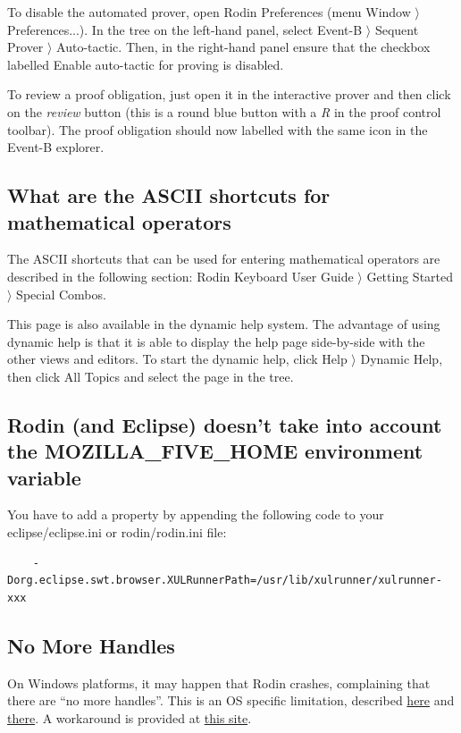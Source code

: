 To disable the automated prover, open \textsf{Rodin Preferences} 
(menu \textsf{Window $\rangle$ Preferences...}). In the tree on the left-hand panel, select \textsf{Event-B $\rangle$ Sequent Prover $\rangle$ Auto-tactic}. Then, in the right-hand panel ensure that the checkbox labelled \textsf{Enable auto-tactic} for proving is disabled. 

To review a proof obligation, just open it in the interactive prover and then click on the \emph{review} button (this is a round blue button with a \emph{R} in the proof control toolbar). The proof obligation should now labelled with the same icon in the Event-B explorer. 

\subsection{What are the ASCII shortcuts for mathematical operators}

The ASCII shortcuts that can be used for entering mathematical operators are described in the following section: \textsf{Rodin Keyboard User Guide $\rangle$ Getting Started $\rangle$ Special Combos}. 

This page is also available in the dynamic help system. The advantage of using dynamic help is that it is able to display the help page side-by-side with the other views and editors. To start the dynamic help, click \textsf{Help $\rangle$ Dynamic Help}, then click \textsf{All Topics} and select the page in the tree. 

\subsection{Rodin (and Eclipse) doesn't take into account the MOZILLA\_FIVE\_HOME environment variable}

You have to add a property by appending the following code to your \textsf{eclipse/eclipse.ini} or \textsf{rodin/rodin.ini} file: 

\begin{verbatim} 
	-Dorg.eclipse.swt.browser.XULRunnerPath=/usr/lib/xulrunner/xulrunner-xxx 
\end{verbatim} 

\subsection{No More Handles}

On Windows platforms, it may happen that Rodin crashes, complaining that there are ``no more handles''. This is an OS specific limitation, described \href{http://journals.jevon.org/users/jevon-phd/entry/19833}{here} and \href{https://bugs.eclipse.org/bugs/show_bug.cgi?id=211124}{there}. A workaround is provided at \href{http://blogs.msdn.com/b/ntdebugging/archive/2007/01/04/desktop-heap-overview.aspx}{this site}. 

